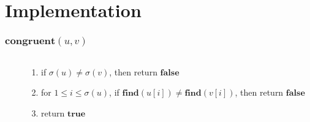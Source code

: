\documentclass[fleqn,t]{beamer}
\begin{document}
\section{Implementation}

\begin{frame}[fragile]
  \frametitle{$\mathbf{congruent}(u, v)$}

  \begin{columns}[T]
    \begin{column}{0.5\textwidth}
    \end{column}
    \begin{column}{0.5\textwidth}
      \begin{enumerate}
        \item if $\sigma(u) \neq \sigma(v)$, then return $\mathbf{false}$
        \item for $1 \leq i \leq \sigma(u)$, if $\mathbf{find}(u[i]) \neq \mathbf{find}(v[i])$,
          then return $\mathbf{false}$
        \item return $\mathbf{true}$
      \end{enumerate}
    \end{column}
  \end{columns}
\end{frame}
\end{document}
